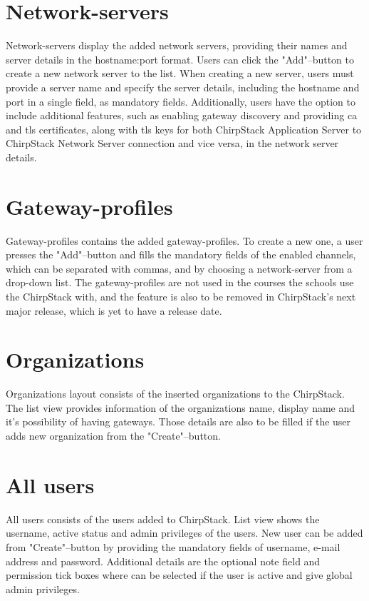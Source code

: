 \section{Network-servers}
Network-servers display the added network servers, providing their names and server details in the hostname:port format.
Users can click the "Add"--button to create a new network server to the list.
When creating a new server, users must provide a server name and specify the server details, including the hostname and port in a single field, as mandatory fields.
Additionally, users have the option to include additional features, such as enabling gateway discovery and providing \gls{ca} and \gls{tls} certificates, along with \gls{tls} keys for both ChirpStack Application Server to ChirpStack Network Server connection and vice versa, in the network server details.

\section{Gateway-profiles}
Gateway-profiles contains the added gateway-profiles.
To create a new one, a user presses the "Add"--button and fills the mandatory fields of the enabled channels, which can be separated with commas, and by choosing a network-server from a drop-down list.
The gateway-profiles are not used in the courses the schools use the ChirpStack with, and the feature is also to be removed in ChirpStack's next major release, which is yet to have a release date.

\section{Organizations}
Organizations layout consists of the inserted organizations to the ChirpStack.
The list view provides information of the organizations name, display name and it's possibility of having gateways.
Those details are also to be filled if the user adds new organization from the "Create"--button.

\section{All users}
All users consists of the users added to ChirpStack.
List view shows the username, active status and admin privileges of the users.
New user can be added from "Create"--button by providing the mandatory fields of username, e-mail address and password. Additional details are the optional note field and permission tick boxes where can be selected if the user is active and give global admin privileges.


